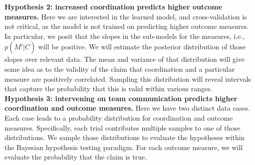 \noindent \textbf{Hypothesis 2: increased coordination predicts higher outcome measures.}
Here we are interested in the learned model, and cross-validation is not
critical, as the model is not trained on predicting higher outcome measures.  In
particular, we posit that the slopes in the sub-models for the measures, i.e.,
$p(M^i|C)$ will be positive. We will estimate the posterior distribution of
those slopes over relevant data. The mean and variance of that distribution will
give some idea as to the validity of the claim that coordination and a
particular measure are positively correlated.  Sampling this distribution will
reveal intervals that capture the probability that this is valid within various
ranges. \\

\noindent \textbf{Hypothesis 3: intervening on team communication predicts higher
coordination and outcome measures.} Here we have two distinct data cases. Each
case leads to a probability distribution for coordination and outcome measures.
Specifically, each trial contributes multiple samples to one of those
distributions. We sample those distributions to evaluate the hypotheses within
the Bayesian hypothesis testing paradigm.  For each outcome measure, we will
evaluate the probability that the claim is true.
